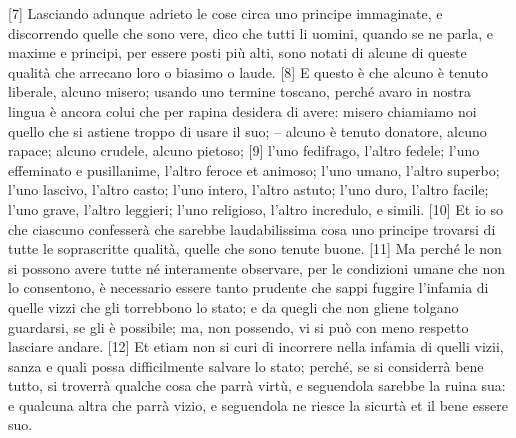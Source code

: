 {[}7{]} Lasciando adunque adrieto le cose circa uno principe immaginate,
e discorrendo quelle che sono vere, dico che tutti li uomini, quando se
ne parla, e maxime e principi, per essere posti più alti, sono notati di
alcune di queste qualità che arrecano loro o biasimo o laude. {[}8{]} E
questo è che alcuno è tenuto liberale, alcuno misero; usando uno termine
toscano, perché avaro in nostra lingua è ancora colui che per rapina
desidera di avere: misero chiamiamo noi quello che si astiene troppo di
usare il suo; -- alcuno è tenuto donatore, alcuno rapace; alcuno
crudele, alcuno pietoso; {[}9{]} l'uno fedifrago, l'altro fedele; l'uno
effeminato e pusillanime, l'altro feroce et animoso; l'uno umano,
l'altro superbo; l'uno lascivo, l'altro casto; l'uno intero, l'altro
astuto; l'uno duro, l'altro facile; l'uno grave, l'altro leggieri; l'uno
religioso, l'altro incredulo, e simili. {[}10{]} Et io so che ciascuno
confesserà che sarebbe laudabilissima cosa uno principe trovarsi di
tutte le soprascritte qualità, quelle che sono tenute buone. {[}11{]} Ma
perché le non si possono avere tutte né interamente observare, per le
condizioni umane che non lo consentono, è necessario essere tanto
prudente che sappi fuggire l'infamia di quelle vizzi che gli torrebbono
lo stato; e da quegli che non gliene tolgano guardarsi, se gli è
possibile; ma, non possendo, vi si può con meno respetto lasciare
andare. {[}12{]} Et etiam non si curi di incorrere nella infamia di
quelli vizii, sanza e quali possa difficilmente salvare lo stato;
perché, se si considerrà bene tutto, si troverrà qualche cosa che parrà
virtù, e seguendola sarebbe la ruina sua: e qualcuna altra che parrà
vizio, e seguendola ne riesce la sicurtà et il bene essere suo.


